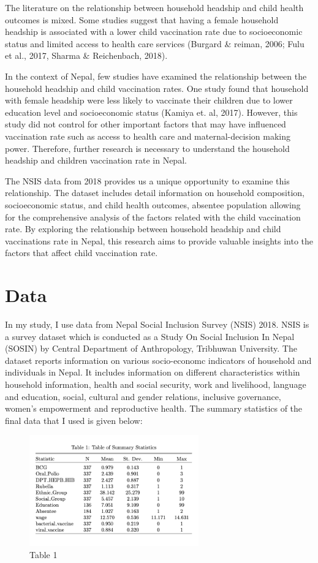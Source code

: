 \documentclass[12pt]{article}
\begin{document}
The literature on the relationship between household headship and child health outcomes is mixed. Some studies suggest that having a female household headship is associated with a lower child vaccination rate due to socioeconomic status and limited access to health care services (Burgard \& reiman, 2006; Fulu et al., 2017, Sharma \& Reichenbach, 2018). 

In the context of Nepal, few studies have examined the relationship between the household headship and child vaccination rates. One study found that household with female headship were less likely to vaccinate their children due to lower education level and socioeconomic status (Kamiya et. al, 2017). However, this study did not control for other important factors that may have influenced vaccination rate such as access to health care and maternal-decision making power. Therefore, further research is necessary to understand the household headship and children vaccination rate in Nepal.

The NSIS data from 2018 provides us a unique opportunity to examine this relationship. The dataset includes detail information on household composition, socioeconomic status, and child health outcomes, absentee population allowing for the comprehensive analysis of the factors related with the child vaccination rate. By exploring the relationship between household headship and child vaccinations rate in Nepal, this research aims to provide valuable insights into the factors that affect child vaccination rate.


\section{Data}
In my study, I use data from Nepal Social Inclusion Survey (NSIS) 2018. NSIS is a survey dataset which is conducted as a Study On Social Inclusion In Nepal (SOSIN) by Central Department of Anthropology, Tribhuwan University.  The dataset reports information on various socio-economc indicators of household and individuals in Nepal. It includes information on different characteristics within household information, health and social security, work and livelihood, language and education, social, cultural and gender relations, inclusive governance, women's empowerment and reproductive health.
The summary statistics of the final data that I used is given below:

\begin{figure}[H]
    \centering
    \includegraphics[width=0.65\textwidth]{summary_statistcs.png}
    \caption{Table 1}
    \label{Table of Summary Statistics}
\end{figure}
\end{document}
